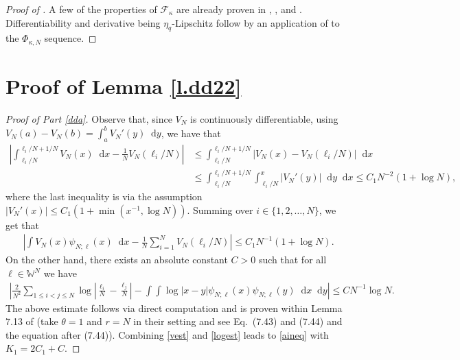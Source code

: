 \documentclass[reqno,11pt]{amsart}
\newcommand{\logq}{\eta_q}
\numberwithin{equation}{section}
\theoremstyle{definition}
\newcommand*\diff{\mathop{}\!\mathrm{d}}
\begin{document}
\begin{proof}[Proof of ] A few of the properties of $\mathcal{F}_\kappa$ are already proven in , , and . Differentiability and derivative being $\logq$-Lipschitz follow by an application of  to the $\Phi_{\kappa,N}$ sequence.
\end{proof}

\appendix




\section{Proof of Lemma \ref{l.dd22}} \label{sec.appb}

\begin{proof}[Proof of Part \ref{dda}]  Observe that, since $V_N$ is continuously differentiable, using $V_N(a)-V_N(b)=\int_{a}^b V_N'(y)\diff y$, we have that
\begin{align*} \left|\int_{\ell_i/N}^{\ell_i/N+1/N} V_N(x)\diff x-\frac1{N}V_N(\ell_i/N)\right| & \le \int_{\ell_i/N}^{\ell_i/N+1/N}\left| V_N(x)-V_N(\ell_i/N)\right|\diff x \\ & \le \int_{\ell_i/N}^{\ell_i/N+1/N}\int_{\ell_i/N}^{x}\left| V_N'(y)\right|\diff y\diff x \le C_1N^{-2}(1+\log N),
\end{align*}
where the last inequality is via the assumption $|V_N'(x)|\le C_1(1+\min(x^{-1},\log N))$. Summing over $i\in \{1,2,\ldots,N\}$, we get that
\begin{align}\label{vest}
    \left|\int V_N(x)\psi_{N;\ell}(x)\diff x-\frac1{N}\sum_{i=1}^N V_N(\ell_i/N)\right| \le C_1N^{-1}(1+\log N).
\end{align}
On the other hand, there exists an absolute constant $C>0$ such that for all $\ell\in \mathbb{W}^N$ we have
\begin{align}\label{logest}
    \left|\frac{2}{N^2}\sum_{1\le i<j\le N}\log \left|\frac{\ell_i}{N}-\frac{\ell_j}N\right|-\int\int \log |x-y|\psi_{N;\ell}(x)\psi_{N;\ell}(y)\diff x\diff y\right|\le CN^{-1}\log N.
\end{align}
The above estimate follows via direct computation and is proven within Lemma 7.13 of \cite{das2022large} (take $\theta=1$ and $r=N$ in their setting and see Eq.~(7.43) and (7.44) and the equation after (7.44)). Combining \eqref{vest} and \eqref{logest} leads to \eqref{aineq} with $K_1=2C_1+C$.
\end{proof}
\end{document}

